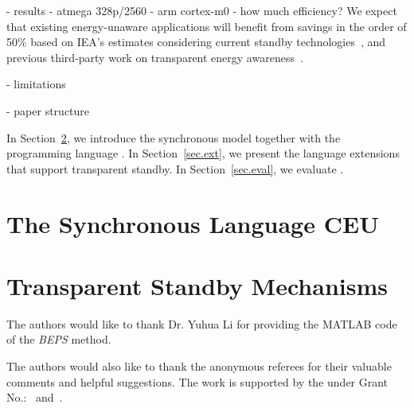 - results
    - atmega 328p/2560
    - arm cortex-m0
    - how much efficiency?
%
We expect that existing energy-unaware applications will benefit from savings
in the order of 50\% based on IEA's estimates considering current standby
technologies~\cite{iea.data}, and previous third-party work on transparent energy
awareness~\cite{wsn.tos.2}.

- limitations

- paper structure

In Section~\ref{sec.ceu}, we introduce the synchronous model together with the
programming language \CEU.
In Section~\ref{sec.ext}, we present the language extensions that support
transparent standby.
In Section~\ref{sec.eval}, we evaluate .

\section{The Synchronous Language CEU}
\label{sec.ceu}

\section{Transparent Standby Mechanisms}
\label{sec.ceu}

\begin{acks}
  The authors would like to thank Dr. Yuhua Li for providing the
  MATLAB code of the \textit{BEPS} method.

  The authors would also like to thank the anonymous referees for
  their valuable comments and helpful suggestions. The work is
  supported by the  under Grant
  No.:~
  and~.

\end{acks}
